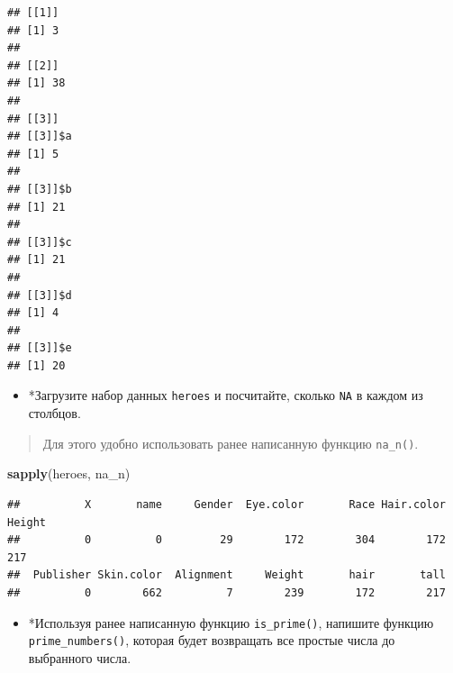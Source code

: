 \documentclass[]{book}
\newenvironment{Shaded}{\begin{snugshade}}{\end{snugshade}}
\newcommand{\KeywordTok}[1]{\textcolor[rgb]{0.13,0.29,0.53}{\textbf{#1}}}
\newcommand{\DecValTok}[1]{\textcolor[rgb]{0.00,0.00,0.81}{#1}}
\newcommand{\StringTok}[1]{\textcolor[rgb]{0.31,0.60,0.02}{#1}}
\newcommand{\ControlFlowTok}[1]{\textcolor[rgb]{0.13,0.29,0.53}{\textbf{#1}}}
\newcommand{\OperatorTok}[1]{\textcolor[rgb]{0.81,0.36,0.00}{\textbf{#1}}}
\newcommand{\NormalTok}[1]{#1}
\providecommand{\tightlist}{%
  \setlength{\itemsep}{0pt}\setlength{\parskip}{0pt}}
\begin{document}
\begin{verbatim}
## [[1]]
## [1] 3
## 
## [[2]]
## [1] 38
## 
## [[3]]
## [[3]]$a
## [1] 5
## 
## [[3]]$b
## [1] 21
## 
## [[3]]$c
## [1] 21
## 
## [[3]]$d
## [1] 4
## 
## [[3]]$e
## [1] 20
\end{verbatim}

\begin{itemize}
\tightlist
\item
  *Загрузите набор данных \texttt{heroes} и посчитайте, сколько
  \texttt{NA} в каждом из столбцов.
\end{itemize}

\begin{quote}
Для этого удобно использовать ранее написанную функцию \texttt{na\_n()}.
\end{quote}

\begin{Shaded}
\begin{Highlighting}[]
\KeywordTok{sapply}\NormalTok{(heroes, na_n)}
\end{Highlighting}
\end{Shaded}

\begin{verbatim}
##          X       name     Gender  Eye.color       Race Hair.color     Height 
##          0          0         29        172        304        172        217 
##  Publisher Skin.color  Alignment     Weight       hair       tall 
##          0        662          7        239        172        217
\end{verbatim}

\begin{itemize}
\tightlist
\item
  *Используя ранее написанную функцию \texttt{is\_prime()}, напишите
  функцию \texttt{prime\_numbers()}, которая будет возвращать все
  простые числа до выбранного числа.
\end{itemize}

\begin{Shaded}
\end{Shaded}
\end{document}
